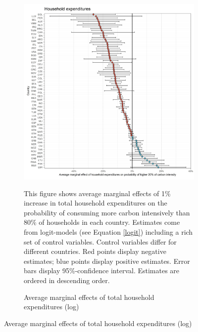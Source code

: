 \begin{figure}[ht!]
  \centering
  \caption{Average marginal effects (logit-models)}\label{fig:Logit_ME}
  \begin{subfigure}[b]{\textwidth}
  \centering
  \caption{Average marginal effects of total household expenditures (log)} \label{fig:Logit_ME_exp}
  \includegraphics{1_Figures/Analysis_Logit_Models_Marginal_Effects/Average_Marginal_Effects_affected_upper_80_log_hh_expenditures_USD_2014_2017.jpg}
  \begin{subcaption2}
     This figure shows average marginal effects of 1\% increase in total household expenditures on the probability of consuming more carbon intensively than 80\% of households in each country. Estimates come from logit-models (see Equation \ref{logit}) including a rich set of control variables. Control variables differ for different countries. Red points display negative estimates; blue points display positive estimates. Error bars display 95\%-confidence interval. Estimates are ordered in descending order.
  \end{subcaption2}
  \end{subfigure}
 \end{figure}
 \clearpage

